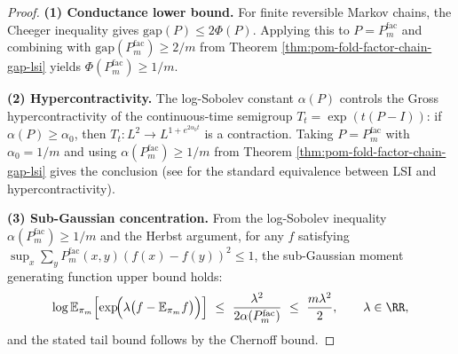 \begin{proof}
\textbf{(1) Conductance lower bound.}
For finite reversible Markov chains, the Cheeger inequality gives \(\mathrm{gap}(P)\le 2\Phi(P)\).
Applying this to \(P=P^{\mathrm{fac}}_m\) and combining with \(\mathrm{gap}(P^{\mathrm{fac}}_m)\ge 2/m\) from Theorem \ref{thm:pom-fold-factor-chain-gap-lsi} yields \(\Phi(P^{\mathrm{fac}}_m)\ge 1/m\).
\par
\textbf{(2) Hypercontractivity.}
The log-Sobolev constant \(\alpha(P)\) controls the Gross hypercontractivity of the continuous-time semigroup \(T_t=\exp(t(P-I))\):
if \(\alpha(P)\ge \alpha_0\), then \(T_t:L^2\to L^{1+e^{2\alpha_0 t}}\) is a contraction.
Taking \(P=P^{\mathrm{fac}}_m\) with \(\alpha_0=1/m\) and using \(\alpha(P^{\mathrm{fac}}_m)\ge 1/m\) from Theorem \ref{thm:pom-fold-factor-chain-gap-lsi} gives the conclusion (see \cite{LevinPeresWilmer2009MarkovMixing} for the standard equivalence between LSI and hypercontractivity).
\par
\textbf{(3) Sub-Gaussian concentration.}
From the log-Sobolev inequality \(\alpha(P^{\mathrm{fac}}_m)\ge 1/m\) and the Herbst argument, for any \(f\) satisfying
\(
\sup_x\sum_y P^{\mathrm{fac}}_m(x,y)(f(x)-f(y))^2\le 1
\),
the sub-Gaussian moment generating function upper bound holds:
\[
\log \mathbb E_{\pi_m}\!\left[\exp\!\Bigl(\lambda\bigl(f-\mathbb E_{\pi_m}f\bigr)\Bigr)\right]
\ \le\ \frac{\lambda^2}{2\alpha(P^{\mathrm{fac}}_m)}
\ \le\ \frac{m\lambda^2}{2},
\qquad \lambda\in\RR,
\]
and the stated tail bound follows by the Chernoff bound.
\end{proof}


